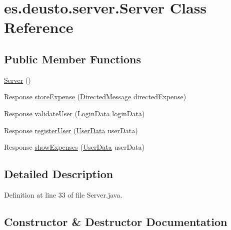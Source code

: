 \hypertarget{classes_1_1deusto_1_1server_1_1_server}{}\section{es.\+deusto.\+server.\+Server Class Reference}
\label{classes_1_1deusto_1_1server_1_1_server}
\subsection*{Public Member Functions}
\begin{DoxyCompactItemize}
\item 
\hyperlink{classes_1_1deusto_1_1server_1_1_server_a84f78162a65dd737f224eb2f94c43023}{Server} ()
\item 
Response \hyperlink{classes_1_1deusto_1_1server_1_1_server_a1a91c5bde8d3b39fc4292dc09d62b61b}{store\+Expense} (\hyperlink{classes_1_1deusto_1_1serialization_1_1_directed_message}{Directed\+Message} directed\+Expense)
\item 
Response \hyperlink{classes_1_1deusto_1_1server_1_1_server_a6e5f5013058ddaf970b0b21da2e32f66}{validate\+User} (\hyperlink{classes_1_1deusto_1_1serialization_1_1_login_data}{Login\+Data} login\+Data)
\item 
Response \hyperlink{classes_1_1deusto_1_1server_1_1_server_a12f56d7a970c3c41fefe8ed2db835c0a}{register\+User} (\hyperlink{classes_1_1deusto_1_1serialization_1_1_user_data}{User\+Data} user\+Data)
\item 
Response \hyperlink{classes_1_1deusto_1_1server_1_1_server_aa28b04cc2643cf60072fc2a680288cde}{show\+Expenses} (\hyperlink{classes_1_1deusto_1_1serialization_1_1_user_data}{User\+Data} user\+Data)
\end{DoxyCompactItemize}


\subsection{Detailed Description}


Definition at line 33 of file Server.\+java.



\subsection{Constructor \& Destructor Documentation}
\mbox{\label{classes_1_1deusto_1_1server_1_1_server_a84f78162a65dd737f224eb2f94c43023}} 
